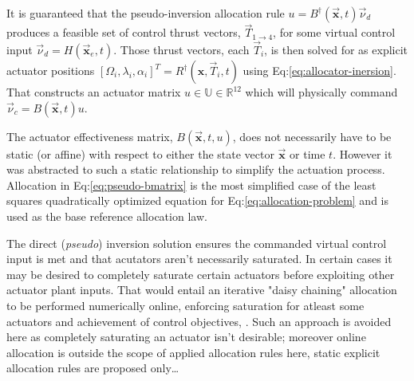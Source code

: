 It is guaranteed that the pseudo-inversion allocation rule $u=B^\dagger(\vec{\mathbf{x}},t)\vec{\nu}_d$ produces a feasible set of control thrust vectors, $\vec{T}_{1\rightarrow 4}$, for some virtual control input $\vec{\nu}_d=H(\vec{\mathbf{x}}_e,t)$.  Those thrust vectors, each $\vec{T}_{i}$, is then solved for as explicit actuator positions $[\Omega_i,\lambda_i,\alpha_i]^T=R^\dagger(\mathbf{x},\vec{T}_i,t)$ using Eq:\ref{eq:allocator-inersion}. That constructs an actuator matrix $u\in\mathbb{U}\in\mathbb{R}^{12}$ which will physically command $\vec{\nu}_c=B(\vec{\mathbf{x}},t)u$. 
\par
The actuator effectiveness matrix, $B(\vec{\mathbf{x}},t,u)$, does not necessarily have to be static (or affine) with respect to either the state vector $\vec{\mathbf{x}}$ or time $t$. However it was abstracted to such a static relationship to simplify the actuation process. Allocation in Eq:\ref{eq:pseudo-bmatrix} is the most simplified case of the least squares quadratically optimized equation for Eq:\ref{eq:allocation-problem} and is used as the base reference allocation law.
\par
The direct (\emph{pseudo}) inversion solution ensures the commanded virtual control input is met and that acutators aren't necessarily saturated. In certain cases it may be desired to completely saturate certain actuators before exploiting other actuator plant inputs. That would entail an iterative "daisy chaining" allocation to be performed numerically online, enforcing saturation for atleast some actuators and achievement of control objectives, \cite{allocation}. Such an approach is avoided here as completely saturating an actuator isn't desirable; moreover online allocation is outside the scope of applied allocation rules here, static explicit allocation rules are proposed only\ldots
